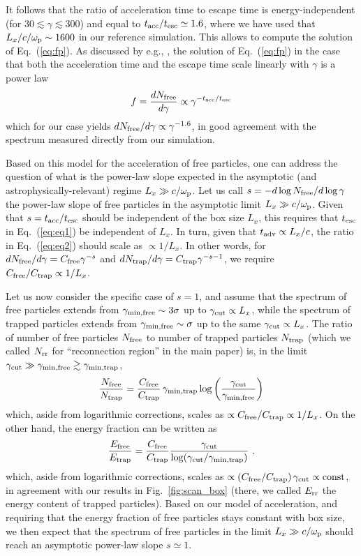 \documentclass[twocolumn,twocolappendix]{aastex63}
\newcommand{\figg}[1]{Fig.~\ref{fig:#1}}
\def\be{\begin{eqnarray}}
\def\ee{\end{eqnarray}}
\newcommand{\eq}[1]{Eq.~(\ref{eq:#1})}
\newcommand{\comp}{c/\omega_{\rm p}}
\begin{document}
It follows that the ratio of acceleration time to escape time is energy-independent (for $30\lesssim\gamma\lesssim 300$) and equal to $t_{\rm acc}/t_{\rm esc}\simeq 1.6$, where we have used that $L_x/\comp\sim 1600$ in our reference simulation. This allows to compute the solution of \eq{fp}. As discussed by e.g., \citet{kirk_98}, the solution of \eq{fp} in the case that both the acceleration time and the escape time scale linearly with $\gamma$ is a power law
\begin{equation}
f=\frac{dN_{\rm free}}{d\gamma}\propto \gamma^{-t_{\rm acc}/t_{\rm esc}}
\end{equation}
which for our case yields $dN_{\rm free}/d\gamma\propto \gamma^{-1.6}$, in good agreement with the spectrum measured directly from our simulation.

Based on this model for the acceleration of free particles, one can address the question of what is the power-law slope expected in the asymptotic (and astrophysically-relevant) regime $L_x\gg \comp$. Let us call $s=-d\log N_{\rm free}/d\log \gamma$ the power-law slope of free particles in the asymptotic limit $L_x\gg \comp$. Given that $s=t_{\rm acc}/t_{\rm esc}$ should be independent of the box size $L_x$, this requires that $t_{\rm esc}$ in \eq{eq1} be independent of $L_x$. In turn, given that $t_{\rm adv}\propto L_x/c$, the ratio in \eq{eq2} should scale as $\propto 1/L_x$. In other words, for $d N_{\rm free}/d\gamma=C_{\rm free} \gamma^{-s}$ and $d N_{\rm trap}/d\gamma=C_{\rm trap} \gamma^{-s-1}$, we require $C_{\rm free}/C_{\rm trap}\propto 1/L_x$. 

Let us now consider the specific case of $s=1$, and assume that the spectrum of free particles extends from $\gamma_{\rm min,free}\sim 3\sigma$ up to $\gamma_{\rm cut}\propto L_x$, while the spectrum of trapped particles extends from  $\gamma_{\rm min,free}\sim \sigma$ up to the same $\gamma_{\rm cut}\propto L_x$. The ratio of number of free particles $N_{\rm free}$ to number of trapped particles $N_{\rm trap}$ (which we called $N_{\rm rr}$ for ``reconnection region'' in the main paper) is, in the limit $\gamma_{\rm cut}\gg\gamma_{\rm min,free}\gtrsim\gamma_{\rm min,trap}$,
\be
\frac{N_{\rm free}}{N_{\rm trap}}=\frac{C_{\rm free}}{C_{\rm trap}} \,{\gamma_{\rm min,trap}} \,{\log\left({\frac{\gamma_{\rm cut}}{\gamma_{\rm min,free}}}\right)}
\ee
which, aside from logarithmic corrections, scales as $\propto C_{\rm free}/C_{\rm trap}\propto 1/L_x$. On the other hand, the energy fraction can be written as
\be
\frac{E_{\rm free}}{E_{\rm trap}}=\frac{C_{\rm free}}{C_{\rm trap}}\frac{\gamma_{\rm cut}}{\log({\gamma_{\rm cut}}/{\gamma_{\rm min,trap}})}~,
\ee
which, aside from logarithmic corrections, scales as $\propto(C_{\rm free}/C_{\rm trap})\,\gamma_{\rm cut}\propto {\rm const}$, in agreement with our results in \figg{scan_box} (there, we called $E_{\rm rr}$ the energy content of trapped particles). Based on our model of acceleration, and requiring that the energy fraction of free particles stays constant with box size, we then expect that the spectrum of free particles in the limit $L_x\gg \comp$ should reach an asymptotic power-law slope $s\simeq 1$.
\end{document}
